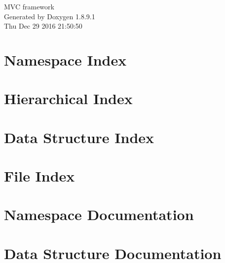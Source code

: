 \documentclass[twoside]{book}
\newcommand{\+}{\discretionary{\mbox{\scriptsize$\hookleftarrow$}}{}{}}
\newcommand{\clearemptydoublepage}{%
  \newpage{\pagestyle{empty}\cleardoublepage}%
}
\begin{document}
\hypersetup{pageanchor=false,
             bookmarks=true,
             bookmarksnumbered=true,
             pdfencoding=unicode
            }
\begin{titlepage}
\vspace*{7cm}
\begin{center}%
{\Large M\+V\+C framework }\\
\vspace*{1cm}
{\large Generated by Doxygen 1.8.9.1}\\
\vspace*{0.5cm}
{\small Thu Dec 29 2016 21:50:50}\\
\end{center}
\end{titlepage}
\clearemptydoublepage
\tableofcontents
\clearemptydoublepage
{}
\hypersetup{pageanchor=true}

\chapter{Namespace Index}

\chapter{Hierarchical Index}

\chapter{Data Structure Index}

\chapter{File Index}

\chapter{Namespace Documentation}

\chapter{Data Structure Documentation}
























\end{document}
